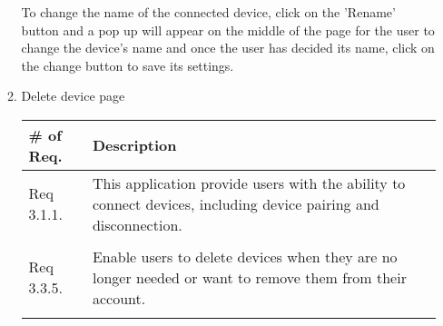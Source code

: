 \begin{enumerate}[label=\arabic*.]
\begin{enumerate}[label*={\arabic*.},ref=\theenumi.\arabic*]
                    To change the name of the connected device, click on the 'Rename' button and a pop up will appear on the middle of the page for the user to change the device's name and once the user has decided its name, click on the change button to save its settings. \\
                    \newpage
              \item Delete device page
                    \begin{table}[H]
                        \center
                        \begin{tabular}{m{1.4cm} m{5.5cm}}
                            \toprule
                            \# of Req. & Description                                                                                                     \\
                            \midrule
                            Req 3.1.1. & This application provide users with the ability to connect devices, including device pairing and disconnection. \\\\
                            Req 3.3.5. & Enable users to delete devices when they are no longer needed or want to remove them from their account.        \\\\
                            \bottomrule
                        \end{tabular}
                    \end{table}


\end{enumerate}
\end{enumerate}

